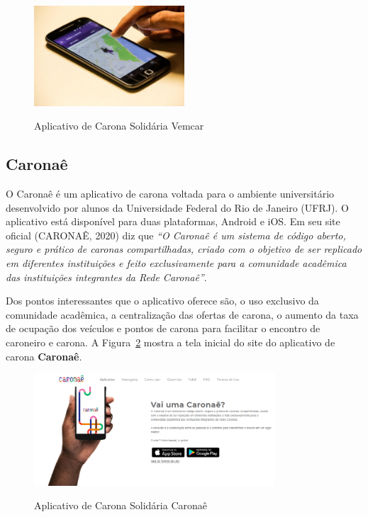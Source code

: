 
\begin{figure}[!hbtp]
	\centering
	\caption{Aplicativo de Carona Solidária Vemcar}
	\includegraphics[width=0.5\textwidth]{./04-figuras/vemcar.jpg}
	\label{fig:tecnologia}
\end{figure}


\subsection{Caronaê}


O Caronaê é um aplicativo de carona voltada para o ambiente universitário desenvolvido por alunos da Universidade Federal do Rio de Janeiro (UFRJ). O aplicativo está disponível para duas plataformas, Android e iOS. Em seu site oficial (CARONAÊ, 2020) diz que \textit{“O Caronaê é um sistema de código aberto, seguro e prático de caronas compartilhadas, criado com o objetivo de ser replicado em diferentes instituições e feito exclusivamente para a comunidade acadêmica das instituições integrantes da Rede Caronaê”}.

Dos pontos interessantes que o aplicativo oferece são, o uso exclusivo da comunidade acadêmica, a centralização das ofertas de carona, o aumento da taxa de ocupação dos veículos e pontos de carona para facilitar o encontro de caroneiro e carona. A Figura~\ref{fig:caronae} mostra a tela inicial do site do aplicativo de carona \textbf{Caronaê}.

\begin{figure}[!hbtp]
	\centering
	\caption{Aplicativo de Carona Solidária Caronaê}
	\includegraphics[width=0.8\textwidth]{./04-figuras/caronae.png}
	\label{fig:caronae}
\end{figure}


